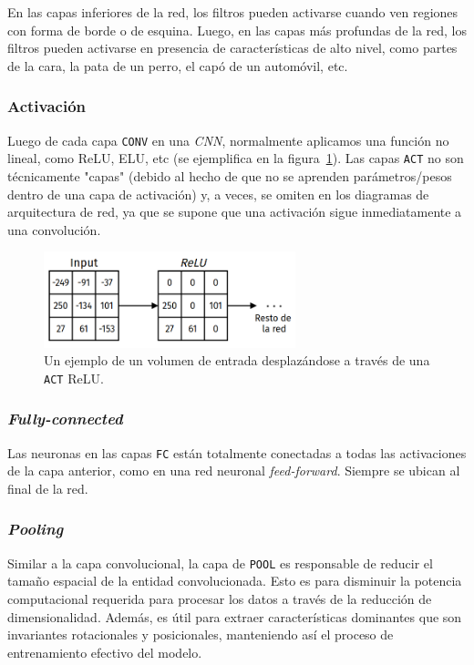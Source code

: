\documentclass[a4paper,12pt]{article}
\begin{document}
En las capas inferiores de la red, los filtros pueden activarse cuando ven regiones con forma de borde o de esquina. Luego, en las capas más profundas de la red, los filtros pueden activarse en presencia de características de alto nivel, como partes de la cara, la pata de un perro, el capó de un automóvil, etc.

\subsubsection{Activación}

Luego de cada capa \texttt{CONV} en una \textit{CNN}, normalmente aplicamos una función no lineal, como ReLU, ELU, etc (se ejemplifica en la figura~\ref{fig:relu-act}). Las capas \texttt{ACT} no son técnicamente "capas" (debido al hecho de que no se aprenden parámetros/pesos dentro de una capa de activación) y, a veces, se omiten en los diagramas de arquitectura de red, ya que se supone que una activación sigue inmediatamente a una convolución.

\begin{figure}[H]
	\begin{center}				
		\includegraphics[width=0.65\textwidth]{tesis_47.png}
		\caption{Un ejemplo de un volumen de entrada desplazándose a través de una \texttt{ACT} ReLU.}
		\label{fig:relu-act}
	\end{center}
\end{figure}

\subsubsection{\textit{Fully-connected}}
Las neuronas en las capas \texttt{FC} están totalmente conectadas a todas las activaciones de la capa anterior, como en una red neuronal \textit{feed-forward}. Siempre se ubican al final de la red.

\subsubsection{\textit{Pooling}}

Similar a la capa convolucional, la capa de \texttt{POOL} es responsable de reducir el tamaño espacial de la entidad convolucionada. Esto es para disminuir la potencia computacional requerida para procesar los datos a través de la reducción de dimensionalidad. Además, es útil para extraer características dominantes que son invariantes rotacionales y posicionales, manteniendo así el proceso de entrenamiento efectivo del modelo.
\end{document}
